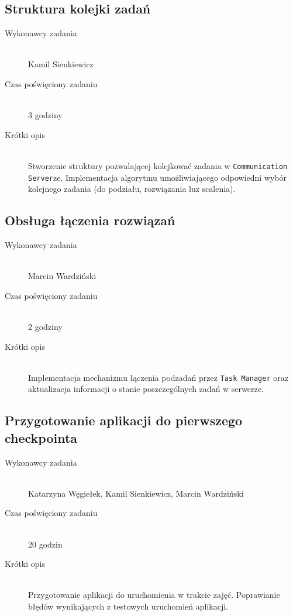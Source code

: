 \documentclass[a4paper]{article}
\begin{document}
\subsection{Struktura kolejki zadań}
\begin{description}
    \item[Wykonawcy zadania] \hfill \\ Kamil Sienkiewicz
    \item[Czas poświęciony zadaniu] \hfill \\ 3 godziny
    \item[Krótki opis] \hfill \\ Stworzenie struktury pozwalającej kolejkować zadania w  \texttt{Communication Server}ze. Implementacja algorytmu umożliwiającego odpowiedni wybór kolejnego zadania (do podziału, rozwiązania luz scalenia).
\end{description}

\subsection{Obsługa łączenia rozwiązań}
\begin{description}
    \item[Wykonawcy zadania] \hfill \\ Marcin Wardziński
    \item[Czas poświęciony zadaniu] \hfill \\ 2 godziny
    \item[Krótki opis] \hfill \\ Implementacja mechanizmu łączenia podzadań przez \texttt{Task Manager} oraz aktualizacja informacji o stanie poszczególnych zadań w serwerze.
\end{description}

\subsection{Przygotowanie aplikacji do pierwszego checkpointa}
\begin{description}
    \item[Wykonawcy zadania] \hfill \\ Katarzyna Węgiełek, Kamil Sienkiewicz, Marcin Wardziński 
    \item[Czas poświęciony zadaniu] \hfill \\ 20 godzin
    \item[Krótki opis] \hfill \\ Przygotowanie aplikacji do uruchomienia w trakcie zajęć. Poprawianie błędów wynikających z testowych uruchomień aplikacji.
\end{description}
\end{document}
